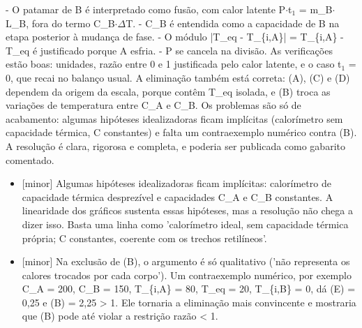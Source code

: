 \documentclass{article}%
\begin{document}
{-} O patamar de B é interpretado como fusão, com calor latente P$\cdot$t$_{1}$ = m\_B$\cdot$L\_B, fora do termo C\_B$\cdot$$\Delta$T.\newline%
{-} C\_B é entendida como a capacidade de B na etapa posterior à mudança de fase.\newline%
{-} O módulo |T\_eq - T\_\{i,A\}| = T\_\{i,A\} - T\_eq é justificado porque A esfria.\newline%
{-} P se cancela na divisão.\newline%
\newline%
As verificações estão boas: unidades, razão entre 0 e 1 justificada pelo calor latente, e o caso t$_{1}$ = 0, que recai no balanço usual. A eliminação também está correta: (A), (C) e (D) dependem da origem da escala, porque contêm T\_eq isolada, e (B) troca as variações de temperatura entre C\_A e C\_B.\newline%
\newline%
Os problemas são só de acabamento: algumas hipóteses idealizadoras ficam implícitas (calorímetro sem capacidade térmica, C constantes) e falta um contraexemplo numérico contra (B). A resolução é clara, rigorosa e completa, e poderia ser publicada como gabarito comentado.%
\begin{itemize}%
\item%
{[}minor{]} Algumas hipóteses idealizadoras ficam implícitas: calorímetro de capacidade térmica desprezível e capacidades C\_A e C\_B constantes. A linearidade dos gráficos sustenta essas hipóteses, mas a resolução não chega a dizer isso. Basta uma linha como 'calorímetro ideal, sem capacidade térmica própria; C constantes, coerente com os trechos retilíneos'.%
\item%
{[}minor{]} Na exclusão de (B), o argumento é só qualitativo ('não representa os calores trocados por cada corpo'). Um contraexemplo numérico, por exemplo C\_A = 200, C\_B = 150, T\_\{i,A\} = 80, T\_eq = 20, T\_\{i,B\} = 0, dá (E) = 0,25 e (B) = 2,25 > 1. Ele tornaria a eliminação mais convincente e mostraria que (B) pode até violar a restrição razão < 1.%
\end{itemize}%
\end{document}

